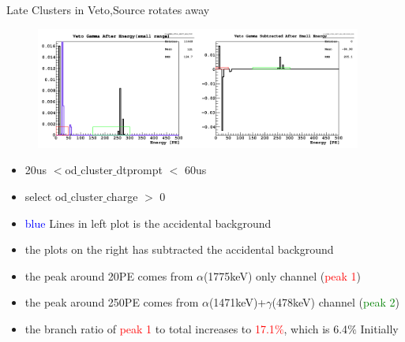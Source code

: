 \documentclass[9pt]{beamer}
\begin{document}
\begin{frame}{Late Clusters in Veto,Source rotates away}
\begin{figure}
\includegraphics[height= 4cm, width=\textwidth]{nv_gamma_after_small_ene_subtracted_away_Feb7PM.png}
\end{figure}
\begin{itemize}
[bullet]
\item 20us $<$od$\_$cluster$\_$dtprompt $<$ 60us
\item  select od$\_$cluster$\_$charge $>$ 0
\item \textcolor{blue}{blue} Lines in left plot is the accidental background 
\item the plots on the right has subtracted the accidental background 
\item the peak around 20PE comes from $\alpha$(1775keV) only channel (\textcolor{red}{peak 1})
\item the peak around 250PE comes from $\alpha$(1471keV)+$\gamma$(478keV) channel (\textcolor{green}{peak 2})
\item the branch ratio of \textcolor{red}{peak 1} to total increases to \textcolor{red}{17.1$\%$}, which is 6.4$\%$ Initially 
\end{itemize}
\end{frame}
\end{document}
